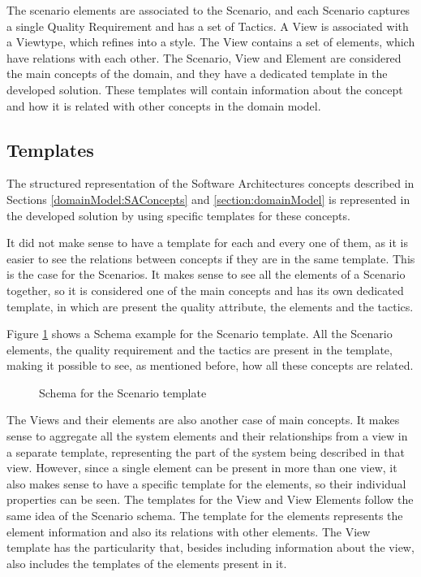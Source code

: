 \documentclass{llncs}
\begin{document}
The scenario elements are associated to the Scenario, and each Scenario captures a single Quality Requirement and has a set of Tactics. A View is associated with a Viewtype, which refines into a style. The View contains a set of elements, which have relations with each other. The Scenario, View and Element are considered the main concepts of the domain, and they have a dedicated template in the developed solution. These templates will contain information about the concept and how it is related with other concepts in the domain model.

\subsection{Templates}
\label{section:templates}
The structured representation of the Software Architectures concepts described in Sections \ref{domainModel:SAConcepts} and \ref{section:domainModel} is represented in the developed solution by using specific templates for these concepts.

It did not make sense to have a template for each and every one of them, as it is easier to see the relations between concepts if they are in the same template. This is the case for the Scenarios. It makes sense to see all the elements of a Scenario together, so it is considered one of the main concepts and has its own dedicated template, in which are present the quality attribute, the elements and the tactics. 

Figure \ref{figure:scenarioTemplate} shows a Schema example for the Scenario template. All the Scenario elements, the quality requirement and the tactics are present in the template, making it possible to see, as mentioned before, how all these concepts are related.

\begin{figure}
\centering

\caption{Schema for the Scenario template}
\label{figure:scenarioTemplate}
\end{figure}

The Views and their elements are also another case of main concepts. It makes sense to aggregate all the system elements and their relationships from a view in a separate template, representing the part of the system being described in that view. However, since a single element can be present in more than one view, it also makes sense to have a specific template for the elements, so their individual properties can be seen. The templates for the View and View Elements follow the same idea of the Scenario schema. The template for the elements represents the element information and also its relations with other elements. The View template has the particularity that, besides including information about the view, also includes the templates of the elements present in it.
\end{document}
